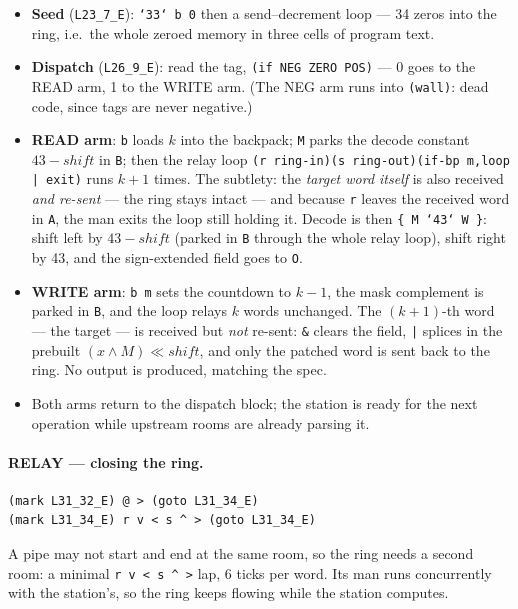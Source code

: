 \documentclass[11pt,a4paper]{article}
\newcommand{\op}[1]{\texttt{#1}}
\begin{document}
\begin{itemize}
  \item \textbf{Seed} (\texttt{L23\_7\_E}): \op{`33` b 0} then a
        send--decrement loop --- 34 zeros into the ring, i.e.\ the whole
        zeroed memory in three cells of program text.
  \item \textbf{Dispatch} (\texttt{L26\_9\_E}): read the tag,
        \texttt{(if NEG ZERO POS)} --- 0 goes to the READ arm, 1 to the
        WRITE arm. (The NEG arm runs into \texttt{(wall)}: dead code, since
        tags are never negative.)
  \item \textbf{READ arm}: \op{b} loads $k$ into the backpack; \op{M} parks
        the decode constant $43-\mathit{shift}$ in \op{B}; then the relay
        loop \texttt{(r ring-in)(s ring-out)(if-bp m,loop | exit)} runs
        $k{+}1$ times. The subtlety: the \emph{target word itself} is also
        received \emph{and re-sent} --- the ring stays intact --- and
        because \op{r} leaves the received word in \op{A}, the man exits
        the loop still holding it. Decode is then
        \op{\{\,M\,`43`\,W\,\}}: shift left by $43-\mathit{shift}$
        (parked in \op{B} through the whole relay loop), shift right by 43,
        and the sign-extended field goes to \texttt{O}.
  \item \textbf{WRITE arm}: \op{b m} sets the countdown to $k-1$, the mask
        complement is parked in \op{B}, and the loop relays $k$ words
        unchanged. The $(k{+}1)$-th word --- the target --- is received but
        \emph{not} re-sent: \op{\&} clears the field, \op{|} splices in the
        prebuilt $(x\wedge M)\ll\mathit{shift}$, and only the patched word
        is sent back to the ring. No output is produced, matching the spec.
  \item Both arms return to the dispatch block; the station is ready for
        the next operation while upstream rooms are already parsing it.
\end{itemize}

\paragraph{RELAY --- closing the ring.}
{\footnotesize
\begin{verbatim}
(mark L31_32_E) @ > (goto L31_34_E)
(mark L31_34_E) r v < s ^ > (goto L31_34_E)
\end{verbatim}
}
A pipe may not start and end at the same room, so the ring needs a second
room: a minimal \op{r\,v\,<\,s\,\^{}\,>} lap, 6 ticks per word. Its man runs
concurrently with the station's, so the ring keeps flowing while the
station computes.
\end{document}
